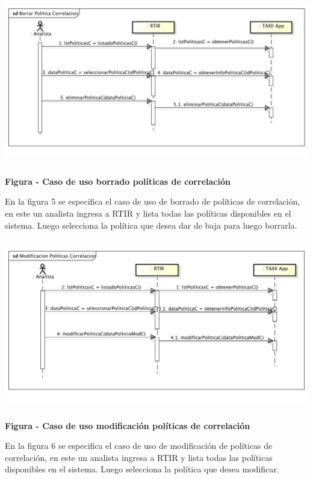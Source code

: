\bigskip
\begin{center}
	\includegraphics[width=5.7634in,height=2.898in]{Analisis22-img/Analisis22-img020.png} 
	{\centering{}\bfseries
		\foreignlanguage{spanish}{Figura }\foreignlanguage{spanish}{ - Caso de uso borrado
			políticas de correlación}
		\par}
\end{center}
{
	En la figura 5 se especifica el caso de uso de borrado de políticas de correlación, en este un analista ingresa a RTIR y
	lista todas las políticas disponibles en el sistema. Luego selecciona la política que desea dar de baja para luego
	borrarla.}


\bigskip


\bigskip
\begin{center}
	\includegraphics[width=5.7638in,height=2.9256in]{Analisis22-img/Analisis22-img021.png} 
	{\centering{}\bfseries
		\foreignlanguage{spanish}{Figura }\foreignlanguage{spanish}{ - Caso de uso modificación
			políticas de correlación}
		\par}
\end{center}
{
	En la figura 6 se especifica el caso de uso de modificación de políticas de correlación, en este un analista ingresa a
	RTIR y lista todas las políticas disponibles en el sistema. Luego selecciona la política que desea modificar.}


